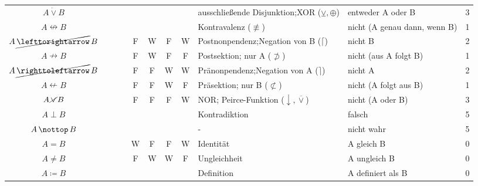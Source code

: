 \documentclass[english,ngerman,parskip=half,headsepline,footsepline]{scrreprt}
\newcommand*{\texttrue}{W}
\newcommand*{\textfalse}{F}
\newcommand*{\lleft}{\operatorname{\righttoleftarrow}}  %
\newcommand*{\lright}{\operatorname{\lefttorightarrow}} %
\newcommand*{\lnequiv}{\operatorname{\nleftrightarrow}} %
\newcommand*{\lxor}{\operatorname{\dot{\lor}}}          %
\newcommand*{\lnright}{\operatorname{\cancel{\lright}}} %
\newcommand*{\lnimp}{\operatorname{\nrightarrow}}       %
\newcommand*{\lnleft}{\operatorname{\cancel{\lleft}}}   %
\newcommand*{\lnleftimp}{\operatorname{\nleftarrow}}    %
\newcommand*{\lnor}{\operatorname{\cancel{\lor}}}       %
\newcommand*{\lbfalse}{\operatorname{\bot}}             %
\newcommand*{\lnbtrue}{\operatorname{\nottop}    }      %
\newcommand*{\defeq}{\coloneqq}
\begin{document}
\begin{table}
\begin{threeparttable}
\begin{tabularx}{\linewidth}{c||c:cc:cccc|X:X|c|}
				\tableline %
				$A\lxor B$&&&&\mrF&\mrW&\mrW&\mrF&ausschließende Disjunktion;\newline XOR ($\veebar, \oplus$)&entweder A oder B&3\\
				\gapline %
				$A\lnequiv B$&&&&&&&&Kontravalenz ($\not\equiv$)&{\small nicht (A genau dann, wenn B)}&1\\
				\tableline %
				$A\lnright B$&&&&\textfalse&\texttrue&\textfalse&\texttrue&Postnonpendenz;\newline Negation von B ($\lceil$)&nicht B&2\\
				\tableline %
				$A\lnimp B$&&&&\textfalse&\texttrue&\textfalse&\textfalse&Postsektion; nur A ($\not\supset$)&nicht (aus A folgt B)&1\\
				\tablegroup %
				$A\lnleft B$&&&&\textfalse&\textfalse&\texttrue&\texttrue&Pränonpendenz;\newline Negation von A ($\rceil$)&nicht A&2\\
				\tableline %
				$A\lnleftimp B$&&&&\textfalse&\textfalse&\texttrue&\textfalse&Präsektion; nur B ($\not\subset$)&nicht (A folgt aus B)&1\\
				\tableline %
				$A\lnor B$&&&&\textfalse&\textfalse&\textfalse&\texttrue&NOR; Peirce-Funktion ($\downarrow, \overline\vee$)&nicht (A oder B)&3\\
				\tableline %
				$A\lbfalse B$&&&&\mrF&\mrF&\mrF&\mrF&Kontradiktion&falsch&5\\
				\gapline %
				$A\lnbtrue B$&&&&&&&&-&nicht wahr&5\\
				\hline\hline %
				$A=B$&&&&\texttrue&\textfalse&\textfalse&\texttrue&Identität&A gleich B&0\\
				\tableline %
				$A\ne B$&&&&\textfalse&\texttrue&\texttrue&\textfalse&Ungleichheit&A ungleich B&0\\
				\tableline %
				$A\defeq B$&&&&&&&&Definition&A definiert als B&0\\

\end{tabularx}
\end{threeparttable}
\end{table}
\end{document}
